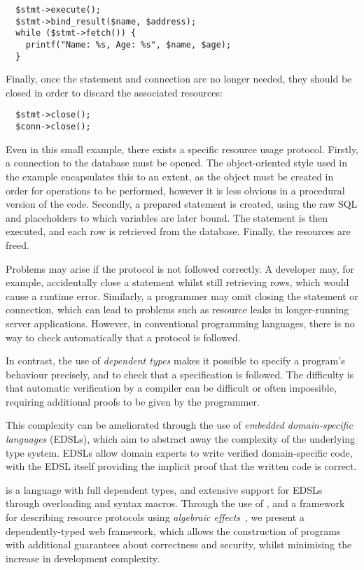 %
\begin{Verbatim}
  $stmt->execute();
  $stmt->bind_result($name, $address);
  while ($stmt->fetch()) {
    printf("Name: %s, Age: %s", $name, $age);
  }
\end{Verbatim}
%
Finally, once the statement and connection are no longer needed, they should be
closed in order to discard the associated resources:

%
\begin{Verbatim}
  $stmt->close();
  $conn->close();
\end{Verbatim}
%
Even in this small example, there exists a specific resource usage protocol.
Firstly, a connection to the database must be opened. The object-oriented style
used in the example encapsulates this to an extent, as the object must be
created in order for operations to be performed, however it is less obvious in
a procedural version of the code. Secondly, a prepared statement is created,
using the raw SQL and placeholders to which variables are later bound. The
statement is then executed, and each row is retrieved from the database.
Finally, the resources are freed. 

Problems may arise if the protocol is not followed correctly.
A developer may, for example, accidentally close a statement whilst still
retrieving rows, which would cause a runtime error. Similarly, a programmer may
omit closing the statement or connection, which can lead to
problems such as resource leaks in longer-running server applications.
However, in conventional programming languages, there is no way to check
automatically that a protocol is followed.

In contrast, the use of \textit{dependent types} makes it possible
to specify a program's behaviour precisely, and to check that a 
specification is followed.
%
The difficulty is 
that automatic verification by a compiler can be difficult or
often impossible, requiring additional proofs to be given by the programmer.

This complexity can be ameliorated through the use of \textit{embedded
domain-specific languages} (EDSLs), which aim to abstract away the
complexity of the underlying type system. EDSLs allow domain experts to
write verified domain-specific code, with the EDSL itself providing the implicit proof that the written code is correct.

\idris{} \cite{brady2011idris} is a language with full dependent types, and
extensive support for EDSLs through overloading and syntax macros. Through the
use of \idris{}, and a framework for describing resource protocols using
\emph{algebraic effects}~\cite{brady:effects}, we
present a dependently-typed web framework, which allows the construction of
programs with additional guarantees about correctness and security, whilst
minimising the increase in development complexity. 

